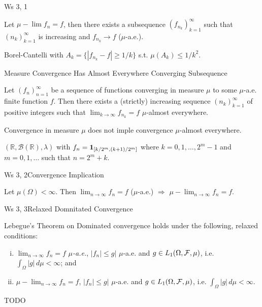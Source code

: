 \begin{exercise}{Ws 3, 1}{}

    Let $\mu-\lim f_n = f$, then there exists a subsequence $(f_{n_k})_{k=1}^{\infty}$ such that $(n_k)_{k=1}^{\infty}$ is increasing and $f_{n_k} \to f$ ($\mu$-a.e.).

    \Hint Borel-Cantelli with $A_k = \{ |f_{n_k} - f| \geq 1/k \}$ s.t. $\mu(A_k) \leq 1/k^2$.

\end{exercise}

\begin{theorem}{5.4}{Measure Convergence Has Almost Everywhere Converging Subsequence}

    Let $(f_n)_{n=1}^{\infty}$ be a sequence of functions converging in measure $\mu$ to some $\mu$-a.e. finite function $f$. Then there exists a (strictly) increasing sequence $(n_k)_{k=1}^{\infty}$ of positive integers such that $\lim_{k \to \infty} f_{n_k} = f$ $\mu$-almost everywhere.

\end{theorem}

\begin{exercise}{5.5}{}

    Convergence in measure $\mu$ does not imple convergence $\mu$-almost everywhere.

    \Hint $(\mathbb{R}, \mathcal{B}(\mathbb{R}), \lambda)$ with $f_n = \mathbf{1}_{[k/2^m, (k+1)/2^m]}$ where $k = 0,1,\hdots,2^m - 1$ and $m=0,1,\hdots$ such that $n = 2^m + k$.

\end{exercise}

\begin{exercise}{Ws 3, 2}{Convergence Implication}

    Let $\mu(\Omega) < \infty$. Then $\lim_{n \to \infty} f_n = f$ ($\mu$-a.e.) $\Rightarrow$ $\mu-\lim_{n \to \infty} f_n = f$.

\end{exercise}

\begin{exercise}{Ws 3, 3}{Relaxed Domnitated Convergence}

    Lebegue's Theorem on Dominated convergence holds under the following, relaxed conditions:

        \begin{enumerate}[(i)]
            \setlength{\parskip}{0em}
            \item $\lim_{n \to \infty} f_n = f$ \emph{$\mu$-a.e.},  $|f_n| \leq g|$ $\mu$-a.e. and $g \in L_1(\Omega, \mathcal{F}, \mu)$, i.e. $\int_{\Omega} |g| \, d\mu < \infty$; and
            \item $\mu-\lim_{n \to \infty} f_n = f$,  $|f_n| \leq g|$ $\mu$-a.e. and $g \in L_1(\Omega, \mathcal{F}, \mu)$, i.e. $\int_{\Omega} |g| \, d\mu < \infty$.
        \end{enumerate}

    \Hint TODO

\end{exercise}
